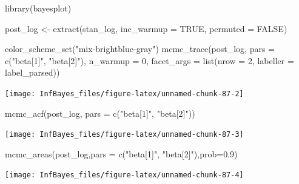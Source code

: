 \documentclass[
]{book}
\newenvironment{Shaded}{\begin{snugshade}}{\end{snugshade}}
\newcommand{\AttributeTok}[1]{\textcolor[rgb]{0.77,0.63,0.00}{#1}}
\newcommand{\ConstantTok}[1]{\textcolor[rgb]{0.00,0.00,0.00}{#1}}
\newcommand{\DecValTok}[1]{\textcolor[rgb]{0.00,0.00,0.81}{#1}}
\newcommand{\FloatTok}[1]{\textcolor[rgb]{0.00,0.00,0.81}{#1}}
\newcommand{\FunctionTok}[1]{\textcolor[rgb]{0.00,0.00,0.00}{#1}}
\newcommand{\NormalTok}[1]{#1}
\newcommand{\OtherTok}[1]{\textcolor[rgb]{0.56,0.35,0.01}{#1}}
\newcommand{\StringTok}[1]{\textcolor[rgb]{0.31,0.60,0.02}{#1}}
\begin{document}
\begin{Shaded}
\begin{Highlighting}[]
\FunctionTok{library}\NormalTok{(bayesplot)}

\NormalTok{post\_log }\OtherTok{\textless{}{-}} \FunctionTok{extract}\NormalTok{(stan\_log, }\AttributeTok{inc\_warmup =} \ConstantTok{TRUE}\NormalTok{, }\AttributeTok{permuted =} \ConstantTok{FALSE}\NormalTok{)}

\FunctionTok{color\_scheme\_set}\NormalTok{(}\StringTok{"mix{-}brightblue{-}gray"}\NormalTok{)}
\FunctionTok{mcmc\_trace}\NormalTok{(post\_log,  }\AttributeTok{pars =} \FunctionTok{c}\NormalTok{(}\StringTok{"beta[1]"}\NormalTok{, }\StringTok{"beta[2]"}\NormalTok{), }\AttributeTok{n\_warmup =} \DecValTok{0}\NormalTok{,}
                \AttributeTok{facet\_args =} \FunctionTok{list}\NormalTok{(}\AttributeTok{nrow =} \DecValTok{2}\NormalTok{, }\AttributeTok{labeller =}\NormalTok{ label\_parsed))}
\end{Highlighting}
\end{Shaded}

\begin{center}\texttt{[image: InfBayes\_files/figure-latex/unnamed-chunk-87-2]} \end{center}

\begin{Shaded}
\begin{Highlighting}[]
\FunctionTok{mcmc\_acf}\NormalTok{(post\_log, }\AttributeTok{pars =} \FunctionTok{c}\NormalTok{(}\StringTok{"beta[1]"}\NormalTok{, }\StringTok{"beta[2]"}\NormalTok{))}
\end{Highlighting}
\end{Shaded}

\begin{center}\texttt{[image: InfBayes\_files/figure-latex/unnamed-chunk-87-3]} \end{center}

\begin{Shaded}
\begin{Highlighting}[]
\FunctionTok{mcmc\_areas}\NormalTok{(post\_log,}\AttributeTok{pars =} \FunctionTok{c}\NormalTok{(}\StringTok{"beta[1]"}\NormalTok{, }\StringTok{"beta[2]"}\NormalTok{),}\AttributeTok{prob=}\FloatTok{0.9}\NormalTok{)}
\end{Highlighting}
\end{Shaded}

\begin{center}\texttt{[image: InfBayes\_files/figure-latex/unnamed-chunk-87-4]} \end{center}
\end{document}
